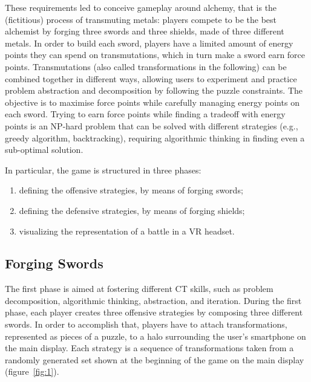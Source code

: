 These requirements led to conceive gameplay around alchemy, that is the (fictitious) process of transmuting metals: players compete to be the best alchemist by forging three swords and three shields, made of three different metals. In order to build each sword, players have a limited amount of energy points they can spend on transmutations, which in turn make a sword earn force points. Transmutations (also called transformations in the following) can be combined together in different ways, allowing users to experiment and practice problem abstraction and decomposition by following the puzzle constraints. The objective is to maximise force points while carefully managing energy points on each sword. Trying to earn force points while finding a tradeoff with energy points is an {\rmfamily NP}-hard problem that can be solved with different strategies (e.g., greedy algorithm, backtracking), requiring algorithmic thinking in finding even a sub-optimal solution.

In particular, the game is structured in three phases:
\begin{enumerate}
\item defining the offensive strategies, by means of forging swords;
\item defining the defensive strategies, by means of forging shields;
\item visualizing the representation of a battle in a \ac{VR} headset.
\end{enumerate}

\subsection{Forging Swords}\label{sec:swords}
The first phase is aimed at fostering different \ac{CT} skills, such as problem decomposition, algorithmic thinking, abstraction, and iteration. During the first phase, each player creates three offensive strategies by composing three different swords. In order to accomplish that, players have to attach transformations, represented as pieces of a puzzle, to a halo surrounding the user's smartphone on the main display. Each strategy is a sequence of transformations taken from a randomly generated set shown at the beginning of the game on the main display (figure~\ref{fig:1}).

